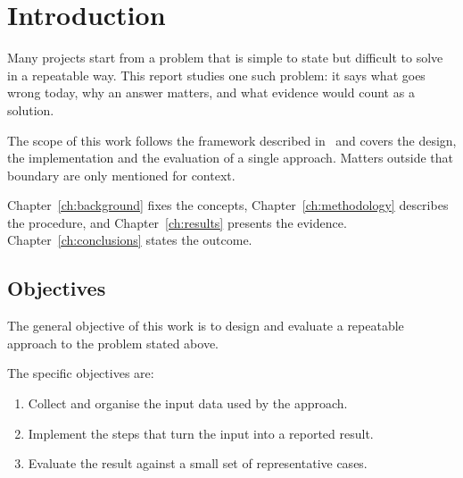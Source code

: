 \chapter{Introduction}
\label{ch:intro}

Many projects start from a problem that is simple to state but difficult to
solve in a repeatable way. This report studies one such problem: it says
what goes wrong today, why an answer matters, and what evidence would count
as a solution.

The scope of this work follows the framework described in~\cite{smith2022}
and covers the design, the implementation and the evaluation of a single
approach. Matters outside that boundary are only mentioned for context.

Chapter~\ref{ch:background} fixes the concepts,
Chapter~\ref{ch:methodology} describes the procedure, and
Chapter~\ref{ch:results} presents the evidence.
Chapter~\ref{ch:conclusions} states the outcome.

\section{Objectives}
\label{sec:objectives}

The general objective of this work is to design and evaluate a repeatable
approach to the problem stated above.

The specific objectives are:
\begin{enumerate}
  \item Collect and organise the input data used by the approach.
  \item Implement the steps that turn the input into a reported result.
  \item Evaluate the result against a small set of representative cases.
\end{enumerate}
